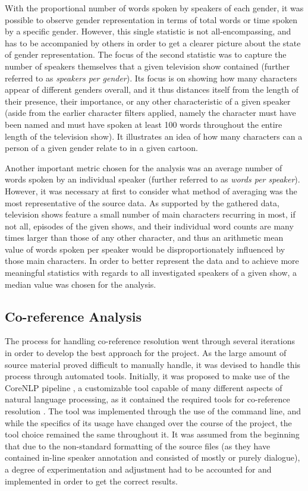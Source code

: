 \documentclass[a4paper, 11pt]{article}
\begin{document}
With the proportional number of words spoken by speakers of each gender, it was possible to observe gender representation in terms of total words or time spoken by a specific gender. However, this single statistic is not all-encompassing, and has to be accompanied by others in order to get a clearer picture about the state of gender representation. The focus of the second statistic was to capture the number of speakers themselves that a given television show contained (further referred to as \textit{speakers per gender}). Its focus is on showing how many characters appear of different genders overall, and it thus distances itself from the length of their presence, their importance, or any other characteristic of a given speaker (aside from the earlier character filters applied, namely the character must have been named and must have spoken at least 100 words throughout the entire length of the television show). It illustrates an idea of how many characters can a person of a given gender relate to in a given cartoon.

Another important metric chosen for the analysis was an average number of words spoken by an individual speaker (further referred to as \textit{words per speaker}). However, it was necessary at first to consider what method of averaging was the most representative of the source data. As supported by the gathered data, television shows feature a small number of main characters recurring in most, if not all, episodes of the given shows, and their individual word counts are many times larger than those of any other character, and thus an arithmetic mean value of words spoken per speaker would be disproportionately influenced by those main characters. In order to better represent the data and to achieve more meaningful statistics with regards to all investigated speakers of a given show, a median value was chosen for the analysis.

\subsection{Co-reference Analysis} \label{met:coref}

The process for handling co-reference resolution went through several iterations in order to develop the best approach for the project. As the large amount of source material proved difficult to manually handle, it was devised to handle this process through automated tools. Initially, it was proposed to make use of the CoreNLP pipeline \citep{manning-EtAl:2014:P14-5}, a customizable tool capable of many different aspects of natural language processing, as it contained the required tools for co-reference resolution \citep{recasens_demarneffe_potts2013,lee11conllst,raghunathan2010}. The tool was implemented through the use of the command line, and while the specifics of its usage have changed over the course of the project, the tool choice remained the same throughout it. It was assumed from the beginning that due to the non-standard formatting of the source files (as they have contained in-line speaker annotation and consisted of mostly or purely dialogue), a degree of experimentation and adjustment had to be accounted for and implemented in order to get the correct results.
\end{document}
